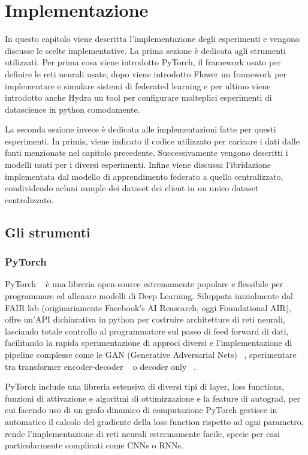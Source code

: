 \chapter{Implementazione}
In questo capitolo viene descritta l'implementazione degli esperimenti
e vengono discusse le scelte implementative.
La prima sezione è dedicata agli strumenti utilizzati. Per prima cosa
viene introdotto PyTorch, il framework usato per 
definire le reti neurali usate, dopo viene introdotto Flower un 
framework per implementare e simulare sistemi di federated learning e 
per ultimo viene introdotto anche Hydra un tool per configurare 
molteplici esperimenti di datascience in python comodamente.

La seconda sezione invece è dedicata alle implementazioni fatte per 
questi esperimenti. In primis, viene indicato il codice utilizzato per 
caricare i dati dalle fonti menzionate nel capitolo precedente.
Successivamente vengono descritti i modelli usati per
i diversi esperimenti. Infine viene discussa l'ibridazione 
implementata dal modello di 
apprendimento federato a quello centralizzato, condividendo acluni 
sample dei dataset dei client in un unico dataset centralizzato.


\section{Gli strumenti}
\subsection{PyTorch}
PyTorch ~\cite{pytorch} è una libreria open-source estremamente popolare e flessibile 
per programmare ed allenare modelli di Deep Learning.
Siluppata inizialmente dal FAIR lab (originariamente Facebook's AI
Reasearch, oggi Foundational AIR), offre
un'API dichiarativa in python per costruire architetture di reti 
neurali, lasciando totale controllo al programmatore sul passo di 
feed forward di dati, facilitando la rapida sperimentazione di 
approci diversi e l'implementazione di pipeline
complesse come le GAN (Generative Adversarial Nets) ~\cite{goodfellow2014gan},
sperimentare tra transformer encoder-decoder ~\cite{vaswani2017trans}
o decoder only ~\cite{Radford2018ImprovingLU}.

PyTorch include una libreria estensiva di diversi tipi di layer,
loss functions, funzioni di attivazione e algoritmi di ottimizzazione
e la feature di autograd,
per cui facendo uso di un grafo dinamico di computazione PyTorch 
gestisce in automatico il calcolo del gradiente della loss function 
rispetto ad ogni parametro, rende l'implementazione di reti neurali 
estremamente facile, specie per casi particolarmente complicati 
come CNNs o RNNs.

